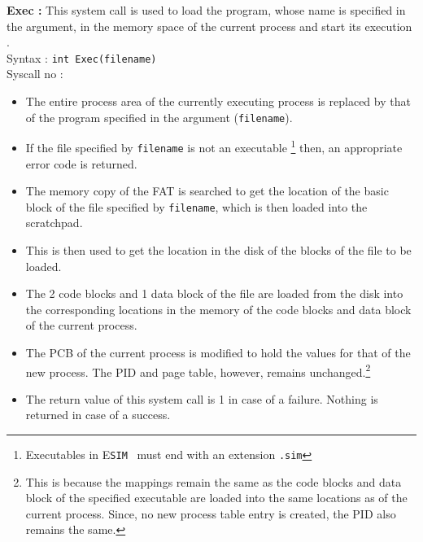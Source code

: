 \documentclass[11pt]{report}
\newcommand{\ESIM}{\textsc{E}\small{\texttt{SIM}}~}
\newcommand\counter[1]{\arabic{#1} \stepcounter{#1}}
\newcounter{syscall}
\begin{document}
\textbf{Exec :}  This system call is used to load the program, whose name is specified in the argument, in the memory space of the current process and start its execution .\\
Syntax : \texttt{int Exec(filename)} \\
Syscall no : \counter{syscall}
\begin{itemize}
	\item The entire process area of the currently executing process is replaced by that of the program specified in the argument (\texttt{filename}). 
	\item If the file specified by \texttt{filename} is not an executable \footnote{Executables in {\ESIM} must end with an extension \texttt{.sim}} then, an appropriate error code is returned.
	\item The memory copy of the FAT  is searched to get the location of the basic block of the file specified by \texttt{filename}, which is then loaded into the scratchpad.
	\item This is then used to get the location in the disk of the blocks of the file to be loaded.
	\item The 2 code blocks and 1 data block of the file are loaded from the disk into the corresponding locations in the memory of the code blocks and data block of the current process.
	\item The PCB of the current process is modified to hold the values for that of the new process. The PID and page table, however, remains unchanged.\footnote{This is because the mappings remain the same as the code blocks and data block of the specified executable are loaded into the same locations as of the current process. Since, no new process table entry is created, the PID also remains the same.}
	\item The return value of this system call is 1 in case of a failure. Nothing is returned in case of a success.
\end{itemize}
\end{document}

